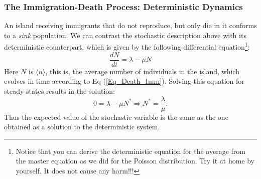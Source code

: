 \subsubsection{The Immigration-Death Process: Deterministic Dynamics}
An island receiving immigrants that do not reproduce, but only die in it conforms to a \textit{sink} population. We can contrast the stochastic description above with its deterministic counterpart, which is given by the following differential equation\footnote{Notice that you can derive the deterministic equation for the average from the master equation as we did for the Poisson distribution. Try it at home by yourself. It does not cause any harm!!!}: 
\begin{equation}
\frac{dN}{dt} = \lambda - \mu N
\label{Eq_Death_Imm}
\end{equation}
Here $N$ is $\langle n \rangle$, this is, the average number of individuals in the island, which evolves in time according to Eq (\ref{Eq_Death_Imm}).  Solving this equation for steady states results in the solution: 
$$0 = \lambda-\mu N^* \Rightarrow N^* = \frac{\lambda}{\mu}. $$
Thus the expected value of the stochastic variable is the same as the one obtained as a solution to the deterministic system. 
